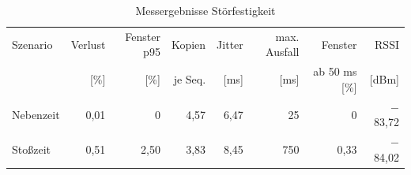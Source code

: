 \begin{table}[htbp]
  \centering
  \small
  \begin{tabular}{lrrrrrrr}
    \toprule
    Szenario & Verlust & Fenster p95 & Kopien & Jitter & max. Ausfall & Fenster & RSSI \\
    & [\%] & [\%] & je Seq. & [ms] & [ms] & ab 50 ms [\%] & [dBm] \\
    \midrule
    Nebenzeit & 0,01 & 0 & 4,57 & 6,47 & 25 & 0 & $-$83,72 \\
    Stoßzeit & 0,51 & 2,50 & 3,83 & 8,45 & 750 & 0,33 & $-$84,02 \\
    \bottomrule
\end{tabular}
\caption{Messergebnisse Störfestigkeit}
  \label{tab:interference-summary}
\end{table}
